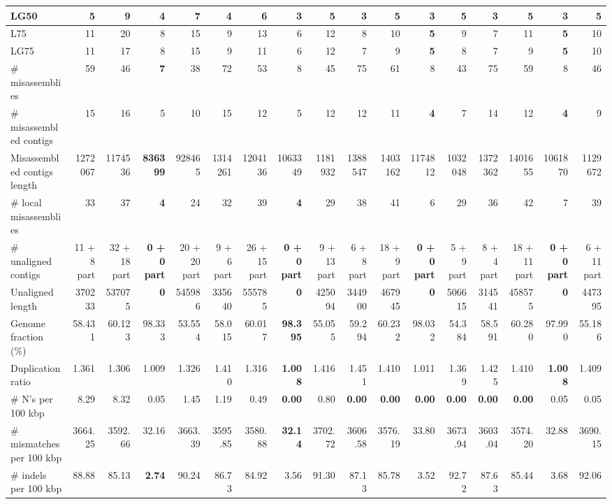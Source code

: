 \documentclass[12pt,a4paper]{article}
\begin{document}
\begin{table}[ht]
\begin{center}
\begin{tabular}{|l*{16}{|r}|}
LG50 & 5 & 9 & 4 & 7 & 4 & 6 & {\bf 3} & 5 & {\bf 3} & 5 & {\bf 3} & 5 & {\bf 3} & 5 & {\bf 3} & 5 \\ \hline
L75 & 11 & 20 & 8 & 15 & 9 & 13 & 6 & 12 & 8 & 10 & {\bf 5} & 9 & 7 & 11 & {\bf 5} & 10 \\ \hline
LG75 & 11 & 17 & 8 & 15 & 9 & 11 & 6 & 12 & 7 & 9 & {\bf 5} & 8 & 7 & 9 & {\bf 5} & 10 \\ \hline
\# misassemblies & 59 & 46 & {\bf 7} & 38 & 72 & 53 & 8 & 45 & 75 & 61 & 8 & 43 & 75 & 59 & 8 & 46 \\ \hline
\# misassembled contigs & 15 & 16 & 5 & 10 & 15 & 12 & 5 & 12 & 12 & 11 & {\bf 4} & 7 & 14 & 12 & {\bf 4} & 9 \\ \hline
Misassembled contigs length & 1272067 & 1174536 & {\bf 836399} & 928465 & 1314261 & 1204136 & 1063349 & 1181932 & 1388547 & 1403162 & 1174812 & 1032048 & 1372362 & 1401655 & 1061870 & 1129672 \\ \hline
\# local misassemblies & 33 & 37 & {\bf 4} & 24 & 32 & 39 & {\bf 4} & 29 & 38 & 41 & 6 & 29 & 36 & 42 & 7 & 39 \\ \hline
\# unaligned contigs & 11 + 8 part & 32 + 18 part & {\bf 0 + 0 part} & 20 + 20 part & 9 + 6 part & 26 + 15 part & {\bf 0 + 0 part} & 9 + 13 part & 6 + 8 part & 18 + 9 part & {\bf 0 + 0 part} & 5 + 9 part & 8 + 4 part & 18 + 11 part & {\bf 0 + 0 part} & 6 + 11 part \\ \hline
Unaligned length & 370233 & 537075 & {\bf 0} & 545986 & 335640 & 555785 & {\bf 0} & 425094 & 344900 & 467945 & {\bf 0} & 506615 & 314541 & 458575 & {\bf 0} & 447395 \\ \hline
Genome fraction (\%) & 58.431 & 60.123 & 98.333 & 53.554 & 58.015 & 60.017 & {\bf 98.395} & 55.055 & 59.294 & 60.232 & 98.032 & 54.384 & 58.591 & 60.280 & 97.990 & 55.186 \\ \hline
Duplication ratio & 1.361 & 1.306 & 1.009 & 1.326 & 1.410 & 1.316 & {\bf 1.008} & 1.416 & 1.451 & 1.410 & 1.011 & 1.369 & 1.425 & 1.410 & {\bf 1.008} & 1.409 \\ \hline
\# N's per 100 kbp & 8.29 & 8.32 & 0.05 & 1.45 & 1.19 & 0.49 & {\bf 0.00} & 0.80 & {\bf 0.00} & {\bf 0.00} & {\bf 0.00} & {\bf 0.00} & {\bf 0.00} & {\bf 0.00} & 0.05 & 0.05 \\ \hline
\# mismatches per 100 kbp & 3664.25 & 3592.66 & 32.16 & 3663.39 & 3595.85 & 3580.88 & {\bf 32.14} & 3702.72 & 3606.58 & 3576.19 & 33.80 & 3673.94 & 3603.04 & 3574.20 & 32.88 & 3690.15 \\ \hline
\# indels per 100 kbp & 88.88 & 85.13 & {\bf 2.74} & 90.24 & 86.73 & 84.92 & 3.56 & 91.30 & 87.13 & 85.78 & 3.52 & 92.72 & 87.63 & 85.44 & 3.68 & 92.06 \\ \hline

\end{tabular}
\end{center}
\end{table}
\end{document}
